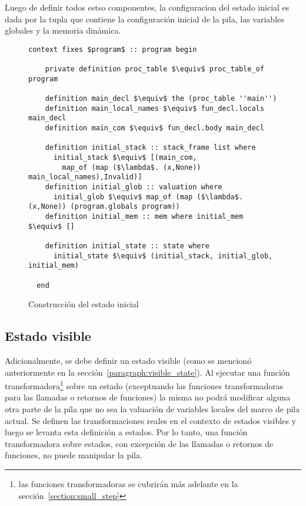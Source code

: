 Luego de definir todos estso componentes, la configuracion del estado inicial es dada por la tupla que contiene la configuración inicial de la pila, las variables globales y la memoria dinámica.


\begin{figure}
  \begin{lstlisting}[frame=single, mathescape=true]
  context fixes $program$ :: program begin

    private definition proc_table $\equiv$ proc_table_of program

    definition main_decl $\equiv$ the (proc_table ''main'')
    definition main_local_names $\equiv$ fun_decl.locals main_decl
    definition main_com $\equiv$ fun_decl.body main_decl

    definition initial_stack :: stack_frame list where
      initial_stack $\equiv$ [(main_com,
        map_of (map ($\lambda$. (x,None)) main_local_names),Invalid)]
    definition initial_glob :: valuation where
      initial_glob $\equiv$ map_of (map ($\lambda$. (x,None)) (program.globals program))
    definition initial_mem :: mem where initial_mem $\equiv$ []

    definition initial_state :: state where
      initial_state $\equiv$ (initial_stack, initial_glob, initial_mem)

  end
  \end{lstlisting}

  \caption{Construcción del estado inicial}
  \label{fig:init_state_building}
\end{figure}



\subsection{Estado visible}\label{subsection:visible_state}

Adicionalmente, se debe definir un estado visible (como se mencionó anteriormente en la sección~\ref{paragraph:visible_state}).
Al ejecutar una función transformadora\footnote{las funciones transformadoras se cubrirán más adelante en la sección~\ref{section:small_step}} sobre un estado (exceptuando las funciones transformadoras para las llamadas o retornos de funciones) la misma no podrá modificar alguna otra parte de la pila que no sea la valuación de variables locales del marco de pila actual.
Se definen las transformaciones reales en el contexto de estados visibles y luego se levanta esta definición a estados.
Por lo tanto, una función transformadora sobre estados, con excepción de las llamadas o retornos de funciones, no puede manipular la pila.

